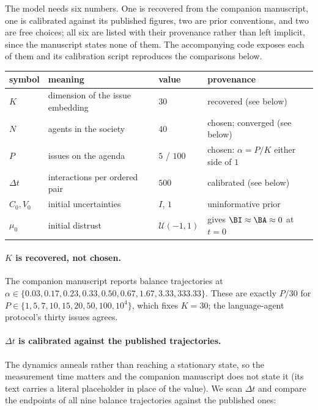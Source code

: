 The model needs six numbers. One is recovered from the companion manuscript, one
is calibrated against its published figures, two are prior conventions, and two
are free choices; all six are listed with their provenance rather than left
implicit, since the manuscript states none of them. The accompanying code exposes
each of them and its calibration script reproduces the comparisons below.

\begin{table}[h]
\centering\small
\begin{tabular}{llll}
\toprule
symbol & meaning & value & provenance \\
\midrule
$K$ & dimension of the issue embedding & $30$ & recovered (see below) \\
$N$ & agents in the society & $40$ & chosen; converged (see below) \\
$P$ & issues on the agenda & $5$ / $100$ & chosen: $\alpha=P/K$ either side of $1$ \\
$\Delta t$ & interactions per ordered pair & $500$ & calibrated (see below) \\
$C_0, V_0$ & initial uncertainties & $I$, $1$ & uninformative prior \\
$\mu_0$ & initial distrust & $\mathcal{U}(-1,1)$ & gives $\BI\approx\BA\approx0$ at $t=0$ \\
\bottomrule
\end{tabular}
\end{table}

\paragraph{$K$ is recovered, not chosen.} The companion manuscript reports
balance trajectories at
$\alpha \in \{0.03, 0.17, 0.23, 0.33, 0.50, 0.67, 1.67, 3.33, 333.33\}$. These are
exactly $P/30$ for $P\in\{1,5,7,10,15,20,50,100,10^{4}\}$, which fixes $K=30$;
the language-agent protocol's thirty issues agrees.

\paragraph{$\Delta t$ is calibrated against the published trajectories.} The
dynamics anneals rather than reaching a stationary state, so the measurement time
matters and the companion manuscript does not state it (its text carries a
literal placeholder in place of the value). We scan $\Delta t$ and compare the
endpoints of all nine balance trajectories against the published ones:

